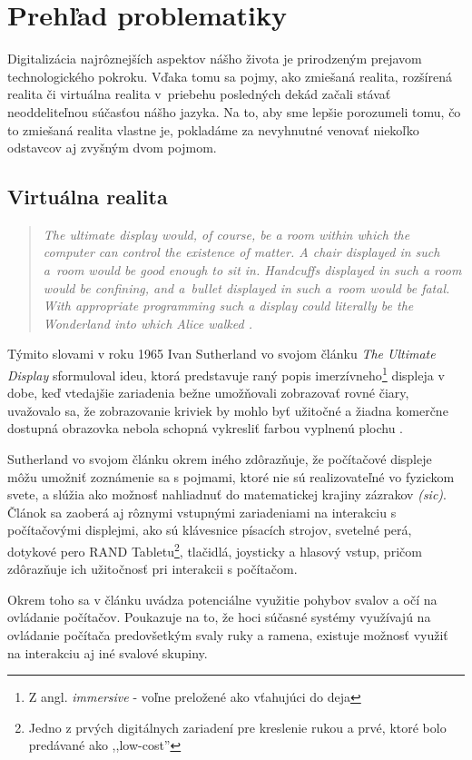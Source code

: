 \section{Prehľad problematiky}
Digitalizácia najrôznejších aspektov nášho života je prirodzeným prejavom technologického pokroku. Vďaka tomu sa 
pojmy, ako zmiešaná realita, rozšírená realita či virtuálna realita v~priebehu posledných dekád začali stávať neoddeliteľnou súčasťou nášho jazyka. 
Na to, aby sme lepšie porozumeli tomu, čo to zmiešaná realita vlastne je, pokladáme za nevyhnutné venovať niekoľko odstavcov aj zvyšným dvom pojmom.

\subsection{Virtuálna realita}
\begin{quote}\itshape
  The ultimate display would, of course, be a room within which the computer can control the existence of matter. A chair displayed in such a~room 
  would be good enough to sit in. Handcuffs displayed in such a room would be confining, and a~bullet displayed in such a~room would be fatal. 
  With appropriate programming such a display could literally be the Wonderland into which Alice walked \cite{sutherlandUltimateDisplay1965b}.
\end{quote}
Týmito slovami v roku 1965 Ivan Sutherland vo svojom článku \emph{The Ultimate Display} sformuloval ideu, ktorá predstavuje raný popis 
imerzívneho\footnote{Z angl. \emph{immersive} - voľne preložené ako vťahujúci do deja} displeja v dobe, keď vtedajšie zariadenia bežne umožňovali 
zobrazovať rovné čiary, uvažovalo sa, že zobrazovanie kriviek by mohlo byť užitočné a žiadna komerčne dostupná obrazovka nebola schopná vykresliť farbou 
vyplnenú plochu \cite{sutherlandUltimateDisplay1965b}. 

Sutherland vo svojom článku okrem iného zdôrazňuje, že počítačové displeje môžu umožniť zoznámenie sa s pojmami, ktoré nie sú realizovateľné vo fyzickom svete, 
a slúžia ako možnosť nahliadnuť do matematickej krajiny zázrakov \emph{(sic)}. Článok sa zaoberá aj rôznymi vstupnými zariadeniami na interakciu s počítačovými 
displejmi, ako sú klávesnice písacích strojov, svetelné perá, dotykové pero RAND Tabletu\footnote{Jedno z prvých digitálnych zariadení pre kreslenie rukou a prvé, 
ktoré bolo predávané ako ,,low-cost''}, tlačidlá, joysticky a hlasový vstup, pričom zdôrazňuje ich užitočnosť pri interakcii s počítačom. 

Okrem toho sa v článku uvádza potenciálne využitie pohybov svalov a očí na ovládanie počítačov. Poukazuje na to, že hoci súčasné systémy využívajú na ovládanie 
počítača predovšetkým svaly ruky a ramena, existuje možnosť využiť na interakciu aj iné svalové skupiny. 

